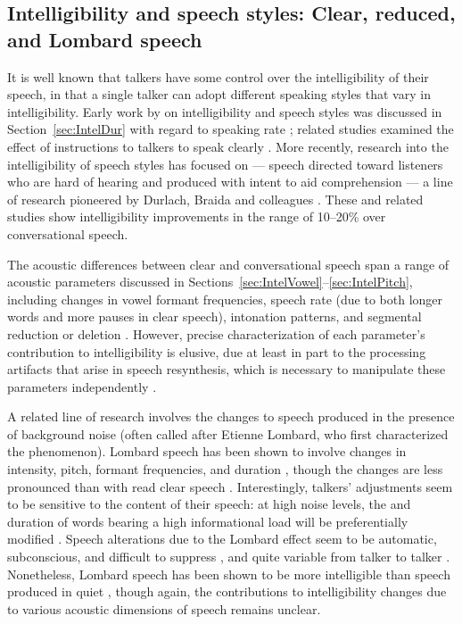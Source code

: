 \subsection[Intelligibility and speech styles]{Intelligibility and speech styles: Clear, reduced, and Lombard speech\label{sec:SpeechStyle}}
It is well known that talkers have some control over the intelligibility of their speech, in that a single talker can adopt different speaking styles that vary in intelligibility.  Early work by \citeauthor{Tolhurst1957a} on intelligibility and speech styles was discussed in Section~\ref{sec:IntelDur} with regard to speaking rate \citep{Tolhurst1957a}; related studies examined the effect of instructions to talkers to speak clearly \citep{Tolhurst1954, Tolhurst1955}.  More recently, research into the intelligibility of speech styles has focused on  — speech directed toward listeners who are hard of hearing and produced with intent to aid comprehension — a line of research pioneered by Durlach, Braida and colleagues \citep[\eg][]{PichenyEtAl1985, PichenyEtAl1986, PichenyEtAl1989, UchanskiEtAl1996, KrauseBraida2004}.  These and related studies show intelligibility improvements in the range of 10–20\% over conversational speech.

The acoustic differences between clear and conversational speech span a range of acoustic parameters discussed in Sections~\ref{sec:IntelVowel}–\ref{sec:IntelPitch}, including changes in vowel formant frequencies, speech rate (due to both longer words and more pauses in clear speech), intonation patterns, and segmental reduction or deletion \citep[see][\intal]{PichenyEtAl1986, LiLoizou2008, SmiljanicBradlow2008, HazanBaker2011}.  However, precise characterization of each parameter’s contribution to intelligibility is elusive, due at least in part to the processing artifacts that arise in speech resynthesis, which is necessary to manipulate these parameters independently \citep[cf. discussions in][]{PichenyEtAl1989, UchanskiEtAl1996, LiuZeng2006, KrauseBraida2009}.

A related line of research involves the changes to speech produced in the presence of background noise (often called  after Etienne Lombard, who first characterized the phenomenon).  Lombard speech has been shown to involve changes in intensity, pitch, formant frequencies, and duration \citep{LaneTranel1971, SummersEtAl1988}, though the changes are less pronounced than with read clear speech \citep{HazanBaker2011}.  Interestingly, talkers’ adjustments seem to be sensitive to the content of their speech: at high noise levels, the \fo{} and duration of words bearing a high informational load will be preferentially modified \citep{PatelSchell2008}.  Speech alterations due to the Lombard effect seem to be automatic, subconscious, and difficult to suppress \citep{PickEtAl1989}, and quite variable from talker to talker \citep{Junqua1993}.  Nonetheless, Lombard speech has been shown to be more intelligible than speech produced in quiet \citep{DreherONeill1957, SummersEtAl1988}, though again, the contributions to intelligibility changes due to various acoustic dimensions of speech remains unclear.

